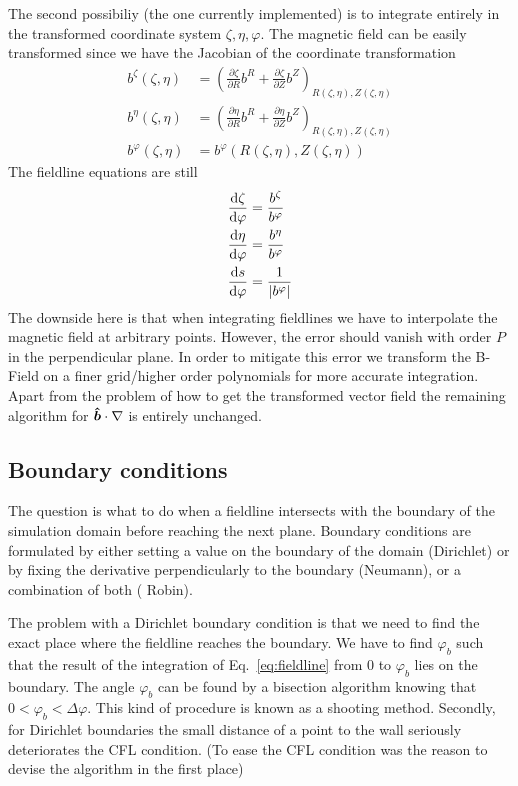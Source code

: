 The second possibiliy (the one currently implemented) 
is to integrate entirely in the 
transformed coordinate system $\zeta, \eta, \varphi$. 
The magnetic field can be easily transformed since we have the
Jacobian of the coordinate transformation
\begin{align}
    b^\zeta(\zeta, \eta) &= \left(\frac{\partial \zeta}{\partial R} b^{R} + \frac{\partial \zeta}{\partial Z}b^Z\right)_{R(\zeta, \eta), Z(\zeta, \eta)} \\
    b^\eta(\zeta, \eta) &= \left(\frac{\partial \eta}{\partial R} b^{R} + \frac{\partial \eta}{\partial Z}b^Z\right)_{R(\zeta, \eta), Z(\zeta, \eta)} \\
    b^\varphi(\zeta, \eta) &= b^\varphi({R(\zeta, \eta), Z(\zeta, \eta)})
    \label{eq:field_trafo}
\end{align}
The fieldline equations are still
\begin{subequations}
\begin{align}
\frac{\mathrm{d} \zeta}{\mathrm{d}\varphi} &= \frac{b^\zeta}{b^\varphi}\\
\frac{\mathrm{d} \eta}{\mathrm{d}\varphi} &= \frac{b^\eta}{b^\varphi}\\
\frac{\mathrm{d} s}{\mathrm{d}\varphi} &= \frac{1}{|b^\varphi|}
\end{align}
\label{eq:fieldlines}
\end{subequations}
The downside here is that when integrating fieldlines we
have to interpolate the magnetic field at arbitrary points. 
However, the error should vanish with order $P$ in the 
perpendicular plane. In order to mitigate this error
we transform the B-Field on a finer grid/higher order polynomials for more accurate
integration.
Apart from the problem of how to get the transformed vector field 
the remaining algorithm for $\bm{\hat{b}}\cdot\nabla$ is entirely unchanged.

\subsection{Boundary conditions}
The question is what to do when a fieldline intersects with the boundary
of the simulation domain before reaching the next plane.
Boundary conditions are formulated by either setting a value 
on the boundary of the domain (Dirichlet) or by fixing 
the derivative perpendicularly to the boundary (Neumann), or 
a combination of both ( Robin). 

The problem with a Dirichlet boundary condition 
is that we need to find the exact place where the fieldline 
reaches the boundary. 
We have to find
$\varphi_b$ such that the result of the integration of Eq.~\eqref{eq:fieldline} from 
$0$ to $\varphi_b$ lies on the boundary. 
The angle $\varphi_b$ can be found by a bisection algorithm knowing that $0<\varphi_b < \Delta\varphi$. 
This kind of procedure is known as a shooting method. 
Secondly, for Dirichlet boundaries the small 
distance of a point to the wall seriously deteriorates the CFL condition. (To ease the CFL condition 
was the reason to devise the algorithm in the first place)

